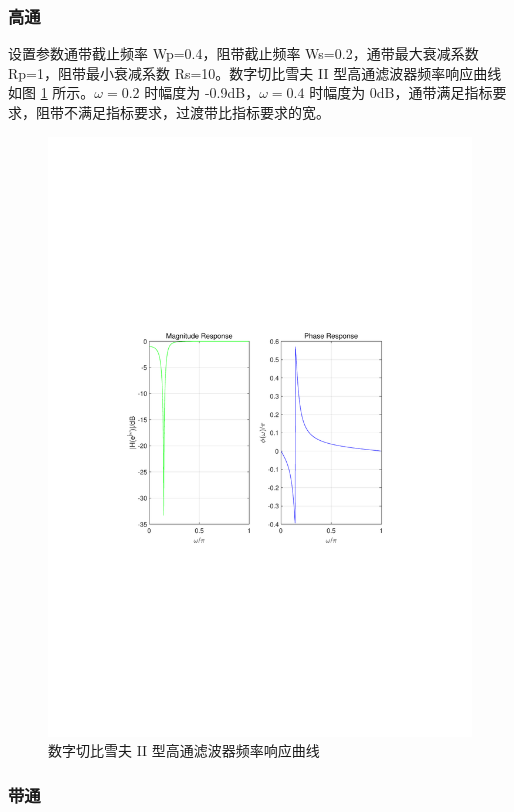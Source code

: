 \documentclass[12pt,AutoFakeBold]{article}
\begin{document}
\subsubsection{高通}

设置参数通带截止频率 Wp=0.4，阻带截止频率 Ws=0.2，通带最大衰减系数 Rp=1，阻带最小衰减系数 Rs=10。数字切比雪夫 II 型高通滤波器频率响应曲线如图 \ref{fig:HPC2F} 所示。$\omega=0.2$ 时幅度为 -0.9dB，$\omega=0.4$ 时幅度为 0dB，通带满足指标要求，阻带不满足指标要求，过渡带比指标要求的宽。

\begin{figure}[hbtp]
	\centering
	\includegraphics[width=14cm]{figure/HPC2F.pdf}
	\caption{数字切比雪夫 II 型高通滤波器频率响应曲线} \label{fig:HPC2F}
\end{figure}

\subsubsection{带通}
\end{document}
